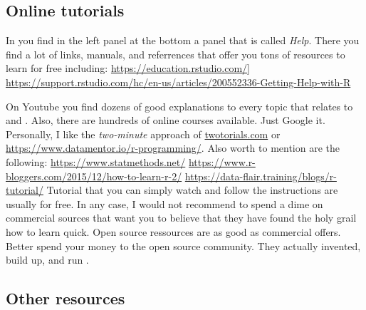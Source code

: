 \subsection{Online tutorials}

In \Rstudio you find in the left panel at the bottom a panel that is called \textit{Help}. There you find a lot of links, manuals, and referrences that offer you tons of resources to learn \R for free including:
\websmall\url{https://education.rstudio.com/}] 
\websmall\url{https://support.rstudio.com/hc/en-us/articles/200552336-Getting-Help-with-R}

On Youtube you find dozens of good explanations to every topic that relates to \R and \Rstudio. Also, there are hundreds of online courses available. Just Google it. Personally, I like the \textit{two-minute} approach of \websmall\url{twotorials.com} or \websmall\url{https://www.datamentor.io/r-programming/}. Also worth  to mention are the following: \websmall\url{https://www.statmethods.net/} \websmall\url{https://www.r-bloggers.com/2015/12/how-to-learn-r-2/} \websmall\url{https://data-flair.training/blogs/r-tutorial/}
Tutorial that you can simply watch and follow the instructions are usually for free. In any case, I would not recommend to spend a dime on commercial sources that want you to believe that they have found the holy grail how to learn \R quick. Open source ressources are as good as commercial offers. Better spend your money to the open source community. They actually invented, build up, and run \R. 




\subsection{Other resources}

